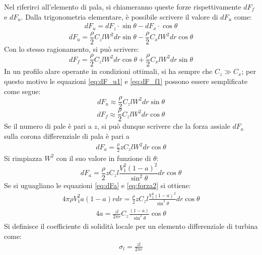 Nel riferirci all'elemento di pala, si chiameranno queste forze rispettivamente $dF_f$ e $dF_u$. Dalla trigonometria elementare, è possibile scrivere il valore di $dF_u$ come:
\begin{align*}
dF_u = dF_z \cdot \sin \theta - dF_x \cdot \cos \theta
\end{align*}
\begin{equation}\label{eq:dF_u1}
dF_u = \frac{\rho}{2} C_z l W^2 dr \sin \theta - \frac{\rho}{2} C_x l W^2 dr \cos \theta
\end{equation}
Con lo stesso ragionamento, si può scrivere:
\begin{equation}\label{eq:dF_f1}
dF_f = \frac{\rho}{2} C_z l W^2 dr \cos \theta + \frac{\rho}{2} C_x l W^2 dr \sin \theta
\end{equation}
In un profilo alare operante in condizioni ottimali, si ha sempre che $C_z \gg C_x$; per questo motivo le equazioni \ref{eq:dF_u1} e \ref{eq:dF_f1} possono essere semplificate come segue:
\begin{equation}\label{eq:dF_u2}
dF_u \approx \frac{\rho}{2} C_zl W^2 dr \sin \theta
\end{equation}
\begin{equation}\label{eq:dF_f2}
dF_f \approx \frac{\rho}{2} C_zl W^2 dr \cos \theta
\end{equation}
Se il numero di pale è pari a $z$, si può dunque scrivere che la forza assiale $dF_a$ sulla corona differenziale di pala è pari a
\begin{align*}
dF_a = \frac{\rho}{2} z C_z l W^2 dr \cos \theta
\end{align*}
Si rimpiazza $W^2$ con il suo valore in funzione di $\theta$:
\begin{equation}\label{eq:dFa}
dF_a = \frac{\rho}{2} z C_z l \frac{V_1^2 \left( 1- a \right)^2}{\sin^2 \theta} dr \cos \theta
\end{equation}
Se si uguagliano le equazioni \ref{eq:dFa} e \ref{eq:forza2} si ottiene:
\begin{align*}
4 \pi \rho V_1^2 a \left( 1-a \right) r dr = \frac{\rho}{2} z C_z l \frac{V_1^2 \left( 1- a \right)^2 }{\sin^2 \theta} dr \cos \theta
\end{align*}
\begin{align*}
4 a = \frac{z l }{2 \pi r} C_z \frac{\left( 1- a \right)}{\sin^2 \theta} \cos \theta
\end{align*}
Si definisce il coefficiente di solidità locale per un elemento differenziale di turbina come:
\begin{align*}
\sigma_l = \frac{z l}{2 \pi r}
\end{align*}
